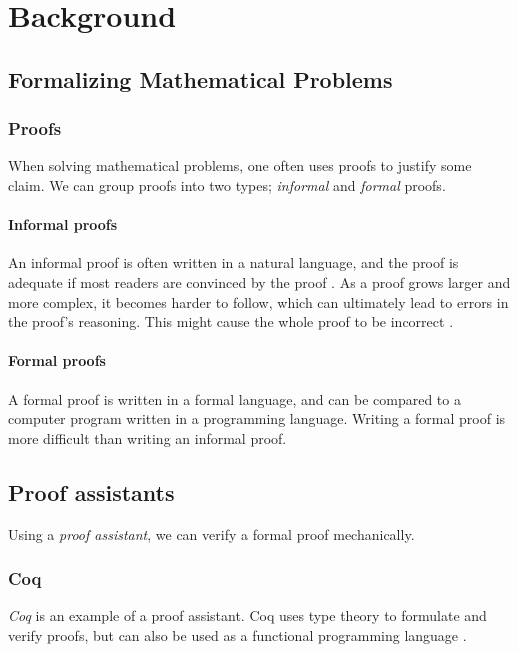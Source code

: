 \chapter{Background}

\section{Formalizing Mathematical Problems}

\subsection{Proofs}

When solving mathematical problems, one often uses proofs
to justify some claim. We can group proofs into two types; \textit{informal} and \textit{formal} proofs.

\subsubsection{Informal proofs}
An informal proof is often written in a natural language, and the proof is adequate if most
readers are convinced by the proof \cite{bpierce}.
As a proof grows larger and more complex, it becomes harder to follow, which can
ultimately lead to errors in the proof's reasoning. This might cause the whole proof
to be incorrect \cite{rkhamsi}.

\subsubsection{Formal proofs}
A formal proof is written in a formal language, and can be compared to a computer program
written in a programming language. Writing a formal proof is more difficult than writing an informal proof.

\section{Proof assistants}

Using a \textit{proof assistant}, we can verify a formal proof mechanically.

\subsection{Coq}
\textit{Coq} is an example of a proof assistant. 
Coq uses type theory to formulate and verify proofs, but can also be used as a functional programming language \cite{cintro}.

